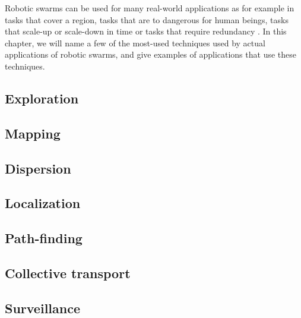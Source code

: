 Robotic swarms can be used for many real-world applications as for example in tasks that cover a region, tasks that are to dangerous for human beings, tasks that scale-up or scale-down in time or tasks that require redundancy \cite{csahin2005swarm}. In this chapter, we will name a few of the most-used techniques used by actual applications of robotic swarms, and give examples of applications that use these techniques.

  \subsection{Exploration}
  
  
  \subsection{Mapping}
  
  
  \subsection{Dispersion}
 

  \subsection{Localization}
 

 \subsection{Path-finding}
 

\subsection{Collective transport}


\subsection{Surveillance}

